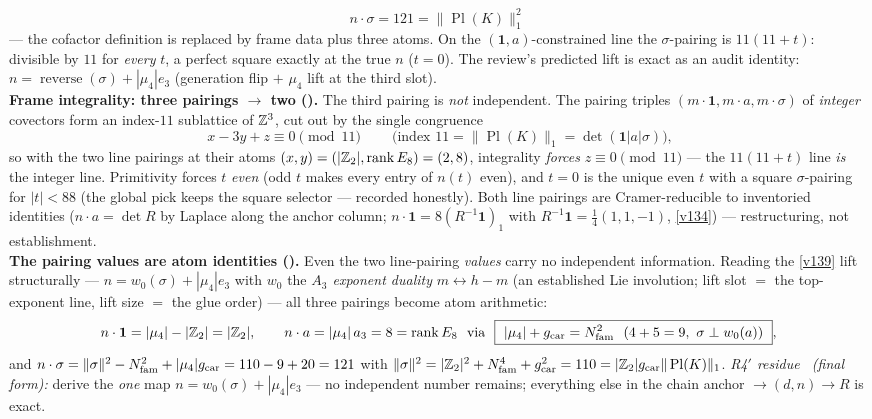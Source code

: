 \begin{keybox}
\[{  n\cdot\sigma=121=\|\operatorname{Pl}(K)\|_1^2\ }
\]
--- the cofactor definition is replaced by frame data plus three atoms. On the $(\mathbf1,a)$-constrained
line the $\sigma$-pairing is $11(11{+}t)$: divisible by $11$ for \emph{every} $t$, a perfect square
exactly at the true $n$ ($t{=}0$). The review's predicted lift is exact as an audit identity:
$n=\operatorname{reverse}(\sigma)+|\mu_4|e_3$ (generation flip $+$ $\mu_4$ lift at the third slot).
\smallskip\\
\noindent\textbf{Frame integrality: three pairings $\to$ two ().}
The third pairing is \emph{not} independent. The pairing triples $(m\cdot\mathbf1, m\cdot a,
m\cdot\sigma)$ of \emph{integer} covectors form an index-$11$ sublattice of $\mathbb Z^3$, cut out by the single
congruence
\[
  \boxed{\ x-3y+z\equiv0 \pmod{11}\ }\qquad\text{(index $11=\|\operatorname{Pl}(K)\|_1=\det(\mathbf1|a|\sigma)$)},
\]
so with the two line pairings at their atoms $(x,y)=(|\mathbb Z_2|,\operatorname{rank}E_8)=(2,8)$, integrality
\emph{forces} $z\equiv0\pmod{11}$ --- the $11(11{+}t)$ line \emph{is} the integer line. Primitivity
forces $t$ \emph{even} (odd $t$ makes every entry of $n(t)$ even), and $t{=}0$ is the unique even $t$
with a square $\sigma$-pairing for $|t|<88$ (the global pick keeps the square selector --- recorded
honestly). Both line pairings are Cramer-reducible to inventoried identities ($n\cdot a=\det R$ by
Laplace along the anchor column; $n\cdot\mathbf1=8(R^{-1}\mathbf1)_1$ with $R^{-1}\mathbf1=\tfrac14(1,1,-1)$,
\vref{v134}) --- restructuring, not establishment.
\smallskip\\
\noindent\textbf{The pairing values are atom identities ().} Even the two
line-pairing \emph{values} carry no independent information. Reading the \vref{v139} lift structurally ---
$n=w_0(\sigma)+|\mu_4|e_3$ with $w_0$ the \emph{$A_3$ exponent duality} $m\leftrightarrow h{-}m$ (an
established Lie involution; lift slot $=$ the top-exponent line, lift size $=$ the glue order) --- all
three pairings become atom arithmetic:
\[
  n\cdot\mathbf1=|\mu_4|-|\Z_2|=|\Z_2|,\qquad
  n\cdot a=|\mu_4|\,a_3=8=\operatorname{rank}E_8\ \ \text{via}\ \
  \boxed{\ |\mu_4|+\gcar=\Nfam^2\ \ (4+5=9,\ \sigma\perp w_0(a))\ },
\]
and $n\cdot\sigma=\|\sigma\|^2-N_{\mathrm{fam}}^2+|\mu_4|g_{\mathrm{car}}=110-9+20=121$ with
$\|\sigma\|^2=|\mathbb Z_2|^2+N_{\mathrm{fam}}^4+g_{\mathrm{car}}^2=110=|\mathbb Z_2|g_{\mathrm{car}}\|\operatorname{Pl}(K)\|_1$.
\emph{R4$'$ residue \mC\ (final form):} derive the \emph{one} map $n=w_0(\sigma)+|\mu_4|e_3$ --- no
independent number remains; everything else in the chain anchor $\to(d,n)\to R$ is exact.

\end{keybox}
